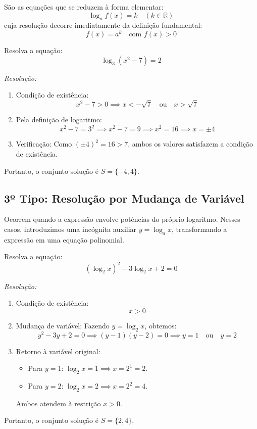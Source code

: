 \documentclass[12pt,a4paper]{report}
\begin{document}
	São as equações que se reduzem à forma elementar:
	$$\log_a f(x) = k \quad (k \in \mathbb{R})$$
	cuja resolução decorre imediatamente da definição fundamental:
	$$f(x) = a^k \quad \text{com } f(x) > 0$$
	
	\begin{destaque}
		Resolva a equação:
		$$\log_3 (x^2 - 7) = 2$$
		
		\textit{Resolução:}
		\begin{enumerate}[label=\textbf{\arabic*.}]
			\item Condição de existência:
			$$x^2 - 7 > 0 \implies x < -\sqrt{7} \quad \text{ou} \quad x > \sqrt{7}$$
			
			\item Pela definição de logaritmo:
			$$x^2 - 7 = 3^2 \implies x^2 - 7 = 9 \implies x^2 = 16 \implies x = \pm 4$$
			
			\item Verificação:
			Como $(\pm 4)^2 = 16 > 7$, ambos os valores satisfazem a condição de existência.
		\end{enumerate}
		Portanto, o conjunto solução é $S = \{-4, 4\}$.
	\end{destaque}
	
	\subsection{3º Tipo: Resolução por Mudança de Variável}
	
	Ocorrem quando a expressão envolve potências do próprio logaritmo. Nesses casos, introduzimos uma incógnita auxiliar $y = \log_a x$, transformando a expressão em uma equação polinomial.
	
	\begin{destaque}
		Resolva a equação:
		$$(\log_2 x)^2 - 3\log_2 x + 2 = 0$$
		
		\textit{Resolução:}
		\begin{enumerate}[label=\textbf{\arabic*.}]
			\item Condição de existência:
			$$x > 0$$
			
			\item Mudança de variável:
			Fazendo $y = \log_2 x$, obtemos:
			$$y^2 - 3y + 2 = 0 \implies (y - 1)(y - 2) = 0 \implies y = 1 \quad \text{ou} \quad y = 2$$
			
			\item Retorno à variável original:
			\begin{itemize}[label=$\circ$]
				\item Para $y = 1$: $\log_2 x = 1 \implies x = 2^1 = 2$.
				\item Para $y = 2$: $\log_2 x = 2 \implies x = 2^2 = 4$.
			\end{itemize}
			Ambos atendem à restrição $x > 0$.
		\end{enumerate}
		Portanto, o conjunto solução é $S = \{2, 4\}$.
	\end{destaque}
	
\end{document}
